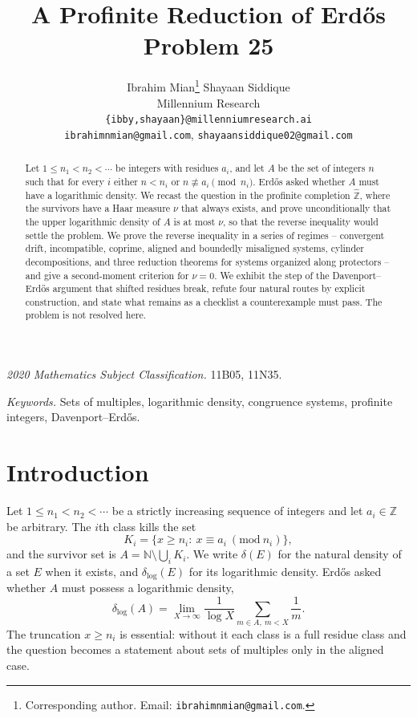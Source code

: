 \documentclass[11pt]{article}
\title{A Profinite Reduction of Erd\H{o}s Problem 25}
\author{Ibrahim Mian\thanks{Corresponding author. Email: \texttt{ibrahimnmian@gmail.com}.} \qquad Shayaan Siddique\\[2pt]
\normalsize Millennium Research\\[2pt]
\normalsize \texttt{\{ibby,shayaan\}@millenniumresearch.ai}\\
\normalsize \texttt{ibrahimnmian@gmail.com}, \texttt{shayaansiddique02@gmail.com}}
\date{}
\theoremstyle{plain}
\theoremstyle{definition}
\newcommand{\Zhat}{\widehat{\mathbb{Z}}}
\newcommand{\N}{\mathbb{N}}
\newcommand{\dlog}{\delta_{\log}}
\begin{document}
\maketitle

\begin{abstract}
Let $1\le n_1<n_2<\cdots$ be integers with residues $a_i$, and
let $A$ be the set of integers $n$ such that for every $i$ either
$n<n_i$ or $n\not\equiv a_i\pmod{n_i}$.  Erd\H{o}s asked whether
$A$ must have a logarithmic density.  We recast the question in
the profinite completion $\Zhat$, where the survivors have a Haar
measure $\nu$ that always exists, and prove unconditionally that
the upper logarithmic density of $A$ is at most $\nu$, so that
the reverse inequality would settle the problem.  We prove the
reverse inequality in a series of regimes -- convergent drift,
incompatible, coprime, aligned and boundedly misaligned systems,
cylinder decompositions, and three reduction theorems for
systems organized along protectors -- and give a second-moment
criterion for $\nu=0$.  We exhibit the step of the
Davenport--Erd\H{o}s argument that shifted residues break, refute
four natural routes by explicit construction, and state what
remains as a checklist a counterexample must pass.  The problem
is not resolved here.
\end{abstract}

{\small\noindent\textit{2020 Mathematics Subject Classification.}
11B05, 11N35.

\noindent\textit{Keywords.} Sets of multiples, logarithmic density,
congruence systems, profinite integers, Davenport--Erd\H{o}s.}


\section{Introduction}\label{sec:intro}

Let $1\le n_1<n_2<\cdots$ be a strictly increasing sequence of
integers and let $a_i\in\mathbb{Z}$ be arbitrary.  The $i$th
class kills the set
\[
  K_i=\{x\ge n_i:\ x\equiv a_i\ (\mathrm{mod}\ n_i)\},
\]
and the survivor set is $A=\N\setminus\bigcup_i K_i$.  We write
$\delta(E)$ for the natural density of a set $E$ when it exists,
and $\dlog(E)$ for its logarithmic density.  Erd\H{o}s
asked whether $A$ must possess a logarithmic density,
\[
  \dlog(A)=\lim_{X\to\infty}\frac{1}{\log X}\sum_{m\in A,\ m<X}\frac1m .
\]
The truncation $x\ge n_i$ is essential: without it each class is
a full residue class and the question becomes a statement about
sets of multiples only in the aligned case.
\end{document}
